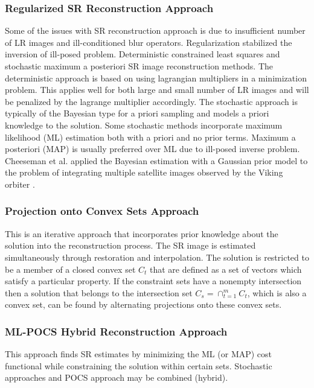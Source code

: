 \subsubsection{Regularized SR Reconstruction Approach}\label{sec3}
Some of the issues with SR reconstruction approach is due to insufficient number of LR images and ill-conditioned blur operators. Regularization stabilized the inversion of ill-posed problem. Deterministic constrained least squares and stochastic maximum a posteriori SR image reconstruction methods. The deterministic approach is based on using lagrangian multipliers in a minimization problem. This applies well for both large and small number of LR images and will be penalized by the lagrange multiplier accordingly. The stochastic approach is typically of the Bayesian type for a priori sampling and models a priori knowledge to the solution. Some stochastic methods incorporate maximum likelihood (ML) estimation both with a priori and no prior terms. Maximum a posteriori (MAP) is usually preferred over ML due to ill-posed inverse problem. Cheeseman et al. applied the Bayesian estimation with a Gaussian prior model to the problem of integrating multiple satellite images observed by the Viking orbiter \cite{Cheeseman1994}.

\subsubsection{Projection onto Convex Sets Approach} \label{sec4}
This is an iterative approach that incorporates prior knowledge about the solution into the reconstruction process. The SR image is estimated simultaneously through restoration and interpolation. The solution is restricted to be a member of a closed convex set $C_{t}$ that are defined as a set of vectors which satisfy a particular property. If the constraint sets have a nonempty intersection then a solution that belongs to the intersection set $C_{s} = \cap_{t=1}^{m} C_{t}$, which is also a convex set, can be found by alternating projections onto these convex sets. 

\subsubsection{ML-POCS Hybrid Reconstruction Approach} \label{sec5}
This approach finds SR estimates by minimizing the ML (or MAP) cost functional while constraining the solution within certain sets. Stochastic approaches and POCS approach may be combined (hybrid).  

